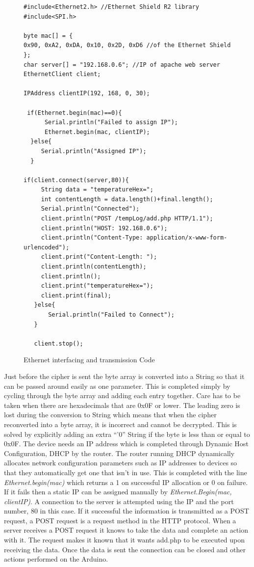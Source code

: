 \begin{figure}[H]
\begin{lstlisting}[style=Arduino]
#include<Ethernet2.h> //Ethernet Shield R2 library
#include<SPI.h>

byte mac[] = {
0x90, 0xA2, 0xDA, 0x10, 0x2D, 0xD6 //of the Ethernet Shield
};
char server[] = "192.168.0.6"; //IP of apache web server
EthernetClient client;

IPAddress clientIP(192, 168, 0, 30);

 if(Ethernet.begin(mac)==0){
      Serial.println("Failed to assign IP");
      Ethernet.begin(mac, clientIP);
  }else{
     Serial.println("Assigned IP");
  }

if(client.connect(server,80)){
     String data = "temperatureHex=";
     int contentLength = data.length()+final.length();
     Serial.println("Connected");   
     client.println("POST /tempLog/add.php HTTP/1.1"); 
     client.println("HOST: 192.168.0.6"); 
     client.println("Content-Type: application/x-www-form-urlencoded");
     client.print("Content-Length: ");
     client.println(contentLength);
     client.println();
     client.print("temperatureHex=");
     client.print(final);
   }else{
       Serial.println("Failed to Connect");
   }
   
   client.stop();
\end{lstlisting}
\caption{Ethernet interfacing and transmission Code }
\label{snip:ethernet}
\end{figure}
 Just before the cipher is sent the byte array is converted into a String so that it can be passed around easily as one parameter. This is completed simply by cycling through the byte array and adding each entry together. Care has to be taken when there are hexadecimals that are 0x0F or lower. The leading zero is lost during the conversion to String which means that when the cipher reconverted into a byte array, it is incorrect and cannot be decrypted. This is solved by explicitly adding an extra ``'0'' String if the byte is less than or equal to 0x0F.  The device needs an IP address which is completed through Dynamic Host Configuration, DHCP by the router. The router running DHCP dynamically allocates network configuration parameters such as IP addresses to devices so that they automatically get one that isn't in use. This is completed with the line \emph{Ethernet.begin(mac)} which returns a 1 on successful IP allocation or 0 on failure. If it fails then a static IP can be assigned manually by \emph{Ethernet.Begin(mac, clientIP)}. A connection to the server is attempted using the IP and the port number, 80 in this case. If it successful the information is transmitted as a POST request, a POST request is a request method in the HTTP protocol. When a server receives a POST request it knows to take the data and complete an action with it. The request makes it known that it wants add.php to be executed upon receiving the data. %
Once the data is sent the connection can be closed and other actions performed on the Arduino.
 
